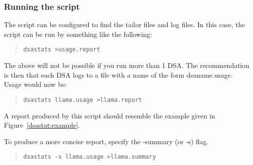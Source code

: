 \subsubsection{Running the script}

The script can be configured to find the tailor files and log files.  In
this case, the script can be run by something like the following:

\begin{quote}\small\begin{verbatim}
dsastats >usage.report
\end{verbatim}\end{quote}

The above will not be possible if you run more than 1 DSA.  The
recommendation is then that each DSA logs to a file with a name of the form
dsaname.usage.  Usage would now be:

\begin{quote}\small\begin{verbatim}
dsastats llama.usage >llama.report
\end{verbatim}\end{quote}

A report produced by this script should resemble the example
given in Figure~\ref{dsastat:example}.

To produce a more concise report, specify the -summary (or -s) flag.

\begin{quote}\small\begin{verbatim}
dsastats -s llama.usage >llama.summary
\end{verbatim}\end{quote}



